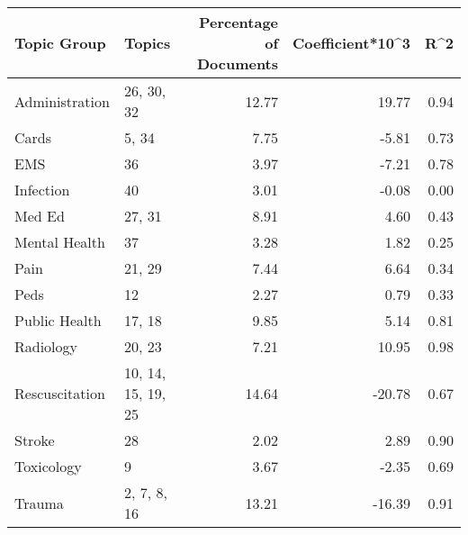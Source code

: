 \begin{tabular}{llrrr}
\toprule
    Topic Group &              Topics &  Percentage of Documents &  Coefficient*10\textasciicircum 3 &   R\textasciicircum 2 \\
\midrule
 Administration &          26, 30, 32 &                    12.77 &             19.77 &  0.94 \\
          Cards &               5, 34 &                     7.75 &             -5.81 &  0.73 \\
            EMS &                  36 &                     3.97 &             -7.21 &  0.78 \\
      Infection &                  40 &                     3.01 &             -0.08 &  0.00 \\
         Med Ed &              27, 31 &                     8.91 &              4.60 &  0.43 \\
  Mental Health &                  37 &                     3.28 &              1.82 &  0.25 \\
           Pain &              21, 29 &                     7.44 &              6.64 &  0.34 \\
           Peds &                  12 &                     2.27 &              0.79 &  0.33 \\
  Public Health &              17, 18 &                     9.85 &              5.14 &  0.81 \\
      Radiology &              20, 23 &                     7.21 &             10.95 &  0.98 \\
 Rescuscitation &  10, 14, 15, 19, 25 &                    14.64 &            -20.78 &  0.67 \\
         Stroke &                  28 &                     2.02 &              2.89 &  0.90 \\
     Toxicology &                   9 &                     3.67 &             -2.35 &  0.69 \\
         Trauma &         2, 7, 8, 16 &                    13.21 &            -16.39 &  0.91 \\
\bottomrule
\end{tabular}
